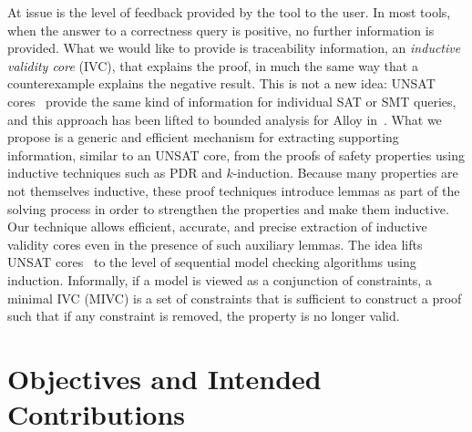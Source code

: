 At issue is the level of feedback provided by the tool to the user. In
most tools, when the answer to a correctness query is positive, no
further information is provided. What we would like to provide is
traceability information, an {\em inductive validity core} (IVC), that explains
the proof, in much the same way that a counterexample explains the
negative result. This is not a new idea: UNSAT cores~\cite{zhang2003extracting}
provide the same kind of information for individual SAT or
SMT queries, and this approach has been lifted to bounded analysis
for Alloy in~\cite{Torlak08:cores}. What we propose is a generic and efficient
mechanism for extracting supporting information, similar to an UNSAT
core, from the proofs of safety properties using inductive techniques
such as PDR and $k$-induction. Because many
properties are not themselves inductive, these proof techniques
introduce lemmas as part of the solving process in order to strengthen
the properties and make them inductive. Our technique allows
efficient, accurate, and precise extraction of inductive validity cores
even in the presence of such auxiliary lemmas. The idea lifts UNSAT cores~\cite{zhang2003extracting}
to the level of sequential model checking algorithms using induction.  Informally, if a model is viewed as a conjunction of constraints,
a minimal IVC (MIVC) is a set of constraints that is sufficient to construct a proof such that if any constraint is removed, the property is no longer valid.

\section{Objectives and Intended Contributions}

